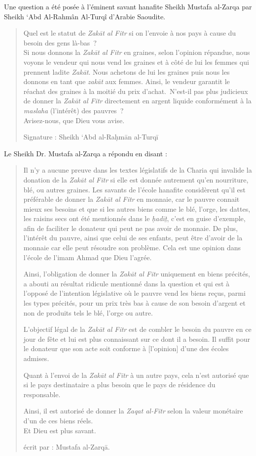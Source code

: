 Une question a été posée à l'éminent savant hanafite Sheikh Mustafa
al-Zarqa par Sheikh `Abd Al-Rahmân Al-Turqî d'Arabie Saoudite.~
\begin{quote}
    

Quel est le statut de \emph{Zakāt al Fitr} si on l'envoie à nos pays à
cause du besoin des gens là-bas~?\\
Si nous donnons la \emph{Zakāt al Fitr} en graines, selon l'opinion
répandue, nous voyons le vendeur qui nous vend les graines et à côté de
lui les femmes qui prennent ladite \emph{Zakāt}. Nous achetons de lui
les graines puis nous les donnons en tant que \emph{zakāt} aux femmes.
Ainsi, le vendeur garantit le réachat des graines à la moitié du prix
d'achat.~N'est-il pas plus judicieux de donner la \emph{Zakāt al Fitr}
directement en argent liquide conformément à la \emph{maslaha}
(l'intérêt) des pauvres~?\\
Avisez-nous, que Dieu vous avise.

Signature : Sheikh `Abd al-Raḥmān al-Turqī
\end{quote}
Le Sheikh Dr. Mustafa al-Zarqa a répondu en disant :
\begin{quote}
Il n'y a aucune preuve dans les textes législatifs de la Charia qui
invalide la donation de la \emph{Zakāt al Fitr} si elle est donnée
autrement qu'en nourriture, blé, ou autres graines. Les savants de
l'école hanafite considèrent qu'il est préférable de donner la
\emph{Zakāt al Fitr} en monnaie, car le pauvre connait mieux ses besoins
et que si les autres biens comme le blé, l'orge, les dattes, les raisins
secs ont été mentionnés dans le \emph{ḥadīṯ}, c'est en guise d'exemple,
afin de faciliter le donateur qui peut ne pas avoir de monnaie. De plus,
l'intérêt du pauvre, ainsi que celui de ses enfants, peut être d'avoir
de la monnaie car elle peut résoudre son problème. Cela est une opinion
dans l'école de l'imam Ahmad que Dieu l'agrée.

Ainsi, l'obligation de donner la \emph{Zakāt al Fitr} uniquement en
biens précités, a abouti au résultat ridicule mentionné dans la question
et qui est à l'opposé de l'intention législative où le pauvre vend les
biens reçus, parmi les types précités, pour un prix très bas à cause de
son besoin d'argent et non de produits tels le blé, l'orge ou autre.

L'objectif légal de la \emph{Zakāt al Fitr} est de combler le besoin du
pauvre en ce jour de fête et lui est plus connaissant sur ce dont il a
besoin. Il suffit pour le donateur que son acte soit conforme à
{[}l'opinion{]} d'une des écoles admises.

Quant à l'envoi de la \emph{Zakāt al Fitr} à un autre pays, cela n'est
autorisé que si le pays destinataire a plus besoin que le pays de
résidence du responsable.

Ainsi, il est autorisé de donner la \emph{Zaqat al-Fitr} selon la valeur
monétaire d'un de ces biens réels.\\
Et Dieu est plus savant.

écrit par : Mustafa al-Zarqā.
\end{quote}
